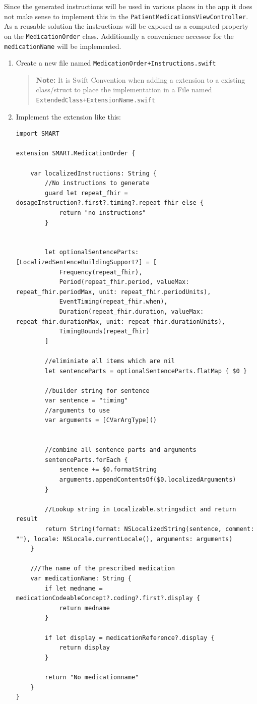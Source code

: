 \documentclass{article}
\begin{document}
Since the generated instructions will be used in various places in the
app it does not make sense to implement this in the
\texttt{PatientMedicationsViewController}.
As a reusable solution the instructions will be exposed as a computed
property on the \texttt{MedicationOrder} class.
Additionally a convenience accessor for the \texttt{medicationName} will
be implemented.

\begin{enumerate}

\item
Create a new file named \texttt{MedicationOrder+Instructions.swift}
\begin{quote}
  \textbf{Note:} It is Swift Convention when adding a
  extension to a existing class/struct to place the implementation in a
  File named \texttt{ExtendedClass+ExtensionName.swift}
\end{quote}

\item Implement the extension like this:
\begin{verbatim}
import SMART

extension SMART.MedicationOrder {

    var localizedInstructions: String {
        //No instructions to generate
        guard let repeat_fhir = dosageInstruction?.first?.timing?.repeat_fhir else {
            return "no instructions"
        }


        let optionalSentenceParts: [LocalizedSentenceBuildingSupport?] = [
            Frequency(repeat_fhir),
            Period(repeat_fhir.period, valueMax: repeat_fhir.periodMax, unit: repeat_fhir.periodUnits),
            EventTiming(repeat_fhir.when),
            Duration(repeat_fhir.duration, valueMax: repeat_fhir.durationMax, unit: repeat_fhir.durationUnits),
            TimingBounds(repeat_fhir)
        ]

        //eliminiate all items which are nil
        let sentenceParts = optionalSentenceParts.flatMap { $0 }

        //builder string for sentence
        var sentence = "timing"
        //arguments to use
        var arguments = [CVarArgType]()


        //combine all sentence parts and arguments
        sentenceParts.forEach {
            sentence += $0.formatString
            arguments.appendContentsOf($0.localizedArguments)
        }

        //Lookup string in Localizable.stringsdict and return result
        return String(format: NSLocalizedString(sentence, comment: ""), locale: NSLocale.currentLocale(), arguments: arguments)
    }

    ///The name of the prescribed medication
    var medicationName: String {
        if let medname = medicationCodeableConcept?.coding?.first?.display {
            return medname
        }

        if let display = medicationReference?.display {
            return display
        }

        return "No medicationname"
    }
}
\end{verbatim}
\end{enumerate}
\end{document}

